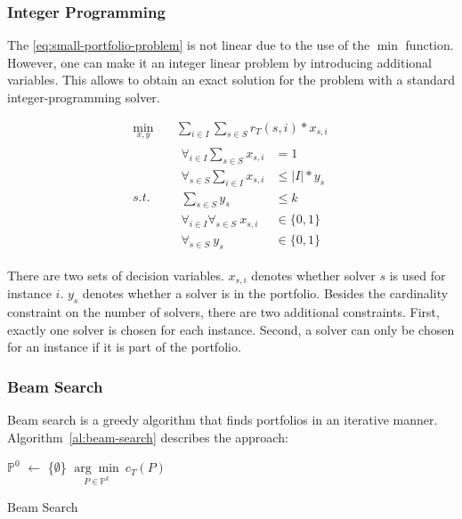 \documentclass[conference]{IEEEtran}
\begin{document}
\subsubsection{Integer Programming}

The \ref{eq:small-portfolio-problem} is not linear due to the use of the $\min$ function.
However, one can make it an integer linear problem by introducing additional variables.
This allows to obtain an exact solution for the problem with a standard integer-programming solver.

\begin{equation}
	\label{eq:small-portfolio-integer-problem}
	\begin{aligned}
		\min_{x,y} \quad & \sum_{i \in I} \sum_{s \in S} r_T(s,i) * x_{s,i} \\
		s.t. \quad & \begin{aligned}
			\forall_{i\in I} \sum_{s \in S} x_{s,i} &= 1\\
			\forall_{s \in S} \sum_{i \in I} x_{s,i} &\leq |I| * y_s\\
			\sum_{s \in S} y_s &\leq k\\
			\forall_{i\in I} \forall_{s \in S}~x_{s,i} &\in \{0, 1\}\\
			\forall_{s \in S}~y_s &\in \{0,1\}
		\end{aligned}
	\end{aligned}
	\tag{Small-Portfolio Integer Problem}
\end{equation}

There are two sets of decision variables.
$x_{s,i}$ denotes whether solver $s$ is used for instance $i$.
$y_s$ denotes whether a solver is in the portfolio.
Besides the cardinality constraint on the number of solvers, there are two additional constraints.
First, exactly one solver is chosen for each instance.
Second, a solver can only be chosen for an instance if it is part of the portfolio.

\subsubsection{Beam Search}

Beam search is a greedy algorithm that finds portfolios in an iterative manner.
Algorithm~\ref{al:beam-search} describes the approach:

\begin{algorithm}[htb]
	$\mathbb{P}^0$ $\leftarrow$ \{$\emptyset$\}
	\Return $\underset{P \in \mathbb{P}^k}{\arg\min}~c_{T}(P)$\;
	\caption{Beam Search}
	\label{al:beam-search}
\end{algorithm}
\end{document}
